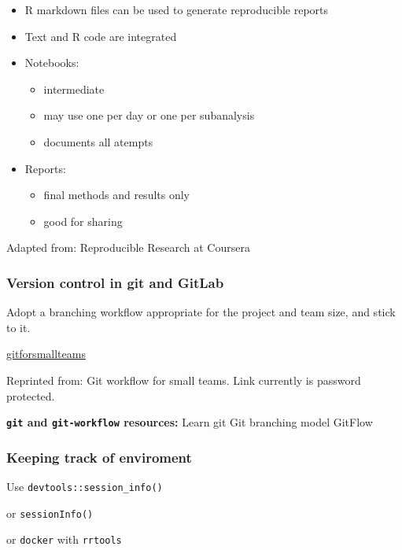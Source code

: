 \documentclass[openany]{article}
\providecommand{\tightlist}{%
  \setlength{\itemsep}{0pt}\setlength{\parskip}{0pt}}
\begin{document}
\begin{itemize}
\item
  R markdown files can be used to generate reproducible reports
\item
  Text and R code are integrated
\item
  Notebooks:

  \begin{itemize}
  \tightlist
  \item
    intermediate
  \item
    may use one per day or one per subanalysis
  \item
    documents all atempts
  \end{itemize}
\item
  Reports:

  \begin{itemize}
  \tightlist
  \item
    final methods and results only
  \item
    good for sharing
  \end{itemize}
\end{itemize}

Adapted from: Reproducible Research at Coursera

\hypertarget{version-control-in-git-and-gitlab}{%
\subsubsection{Version control in git and GitLab}\label{version-control-in-git-and-gitlab}}

Adopt a branching workflow appropriate for the project and team size, and stick to it.

\url{gitforsmallteams}

Reprinted from: Git workflow for small teams. Link currently is password protected.

\textbf{\texttt{git} and \texttt{git-workflow} resources:}
Learn git
Git branching model
GitFlow

\hypertarget{keeping-track-of-enviroment}{%
\subsubsection{Keeping track of enviroment}\label{keeping-track-of-enviroment}}

Use \texttt{devtools::session\_info()}

or \texttt{sessionInfo()}

or \texttt{docker} with \texttt{rrtools}


\end{document}

